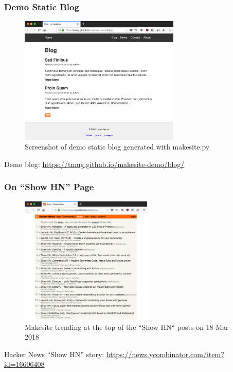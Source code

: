 \documentclass{beamer}
\newcommand{\linkcaption}[1]{
    \centering \scriptsize #1
}
\begin{document}
\begin{frame}
    \frametitle{Demo Static Blog}

    \begin{figure}
        \centering
        \includegraphics[height=2.4in]{makesite-demo-blog.png}
        \caption{
            Screenshot of demo static blog generated with makesite.py
        }
    \end{figure}

    \linkcaption{
        Demo blog: \url{https://tmug.github.io/makesite-demo/blog/}
    }
\end{frame}


\begin{frame}
    \frametitle{On ``Show HN'' Page}

    \begin{figure}
        \centering
        \includegraphics[height=2.4in]{makesite-showhn.png}
        \caption{
            Makesite trending at the top of the ``Show HN`` posts on
            18 Mar 2018
        }
    \end{figure}

    \linkcaption{
        Hacker News ``Show HN'' story:
        \url{https://news.ycombinator.com/item?id=16606408}
    }

\end{frame}
\end{document}
